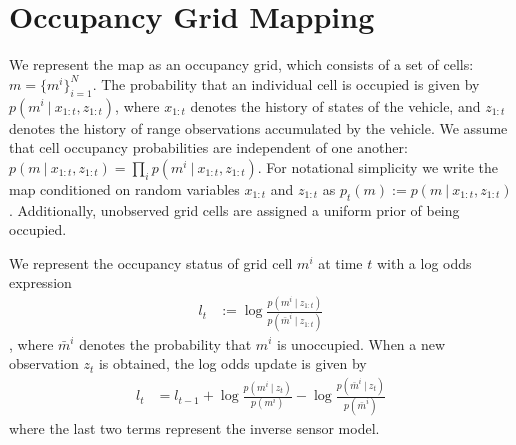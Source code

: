 \section{Occupancy Grid Mapping}
\label{section:occupancy_grid_mapping}

We represent the map as an occupancy grid, which consists of a set of cells: $m = \{m^{i}\}_{i=1}^{N}$.
The probability that an individual cell is occupied is given by $p\left(m^{i} \ \vert \ x_{1:t}, z_{1:t}\right)$, where $x_{1:t}$ denotes the history of states of the vehicle, and $z_{1:t}$ denotes the history of range observations accumulated by the vehicle.
We assume that cell occupancy probabilities are independent of one another: $p\left(m \ \vert \ x_{1:t}, z_{1:t}\right) = \prod_{i} p\left(m^{i} \ \vert \ x_{1:t}, z_{1:t}\right)$.
For notational simplicity we write the map conditioned on random variables $x_{1:t}$ and $z_{1:t}$ as $p_{t}\left(m\right) := p\left(m \ \vert \ x_{1:t}, z_{1:t}\right)$.
Additionally, unobserved grid cells are assigned a uniform prior of being occupied.

We represent the occupancy status of grid cell $m^i$ at time $t$ with a log odds expression
\begin{align}
  l_t &:= \log \frac{p \left( m^i \ \vert \ z_{1:t} \right)}{p \left( \bar{m}^i \ \vert \ z_{1:t} \right)}
\end{align}
, where $\bar{m}^i$ denotes the probability that $m^i$ is unoccupied.
When a new observation $z_t$ is obtained, the log odds update is given by
\begin{align}
  l_t &= l_{t-1} + \log \frac{p\left( m^i \ \vert \ z_t \right)}{p \left( m^i \right)} - \log \frac{p\left( \bar{m}^i \ \vert \ z_t \right)}{p \left(\bar{m}^i \right)}
\end{align}
where the last two terms represent the inverse sensor model.
